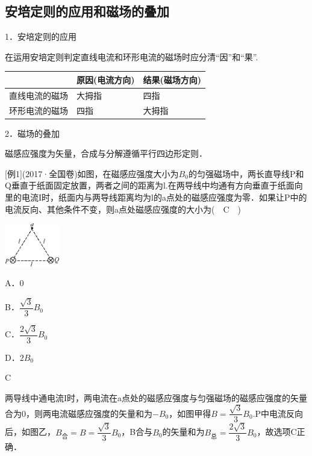\documentclass[cn,10.5pt,chinese,mac,chinesefont=founder]{elegantbook}
\begin{document}
\newpage
\subsection{安培定则的应用和磁场的叠加}

1．安培定则的应用

在运用安培定则判定直线电流和环形电流的磁场时应分清``因''和``果''.

\begin{longtable}[]{@{}m{4cm}m{4cm}m{4cm}@{}}
\toprule
 & \begin{minipage}[b]{0.30\columnwidth}\raggedright
原因(电流方向)\strut
\end{minipage} & \begin{minipage}[b]{0.30\columnwidth}\raggedright
结果(磁场方向)\strut
\end{minipage}\tabularnewline
\midrule
\endhead
直线电流的磁场 & 大拇指 & 四指\tabularnewline
环形电流的磁场 & 四指 & 大拇指\tabularnewline
\bottomrule
\end{longtable}


2．磁场的叠加

磁感应强度为矢量，合成与分解遵循平行四边形定则．

{[}例1{]}(2017·全国卷\uppercase\expandafter{})如图，在磁感应强度大小为$B_0$的匀强磁场中，两长直导线P和Q垂直于纸面固定放置，两者之间的距离为l.在两导线中均通有方向垂直于纸面向里的电流I时，纸面内与两导线距离均为l的a点处的磁感应强度为零．如果让P中的电流反向、其他条件不变，则a点处磁感应强度的大小为(　C　)

\begin{center}\includegraphics[width=0.93403in,height=0.73611in]{media/image339.png}\end{center}

A．0 

B．$\dfrac{\sqrt{3}}{3} B_{0}$

C．$\dfrac{2 \sqrt{3}}{3} B_{0}$ 

D．$2B_0$
\begin{solution}
	C
	
	两导线中通电流I时，两电流在a点处的磁感应强度与匀强磁场的磁感应强度的矢量合为0，则两电流磁感应强度的矢量和为$-B_0$，如图甲得$B=\dfrac{\sqrt{3}}{3} B_{0}$.P中电流反向后，如图乙，$B_{\text{合}}=B=\dfrac{\sqrt{3}}{3} B_{0}$，B合与$B_0$的矢量和为$B_{\text{总}}=\dfrac{2\sqrt{3}}{3} B_{0}$，故选项C正确．
\end{solution}
\end{document}
